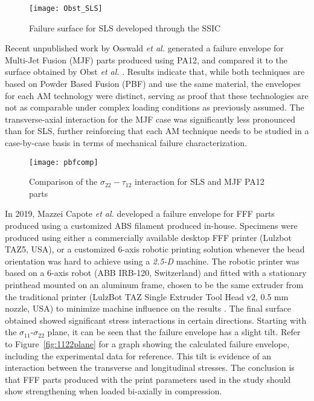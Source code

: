 \documentclass[main.tex]{subfiles}
\begin{document}
\begin{figure}[h]
	\center
	\texttt{[image: Obst\_SLS]}
	\caption{Failure surface for SLS developed through the SSIC \cite{Obst2018}} \label{fig:OOCSLS}
\end{figure}

Recent unpublished work by Osswald \emph{et al.} \cite{Osswald2020} generated a failure envelope for Multi-Jet Fusion (MJF) parts produced using PA12, and compared it to the surface obtained by Obst \emph{et al.} \cite{Obst2018}. Results indicate that, while both techniques are based on Powder Based Fusion (PBF) and use the same material, the envelopes for each AM technology were distinct, serving as proof that these technologies are not as comparable under complex loading conditions as previously assumed. The transverse-axial interaction for the MJF case was significantly less pronounced than for SLS, further reinforcing that each AM technique needs to be studied in a case-by-case basis in terms of mechanical failure characterization. 

\begin{figure}[!htbp]
	\center
	\texttt{[image: pbfcomp]}
	\caption{Comparison of the $\sigma_{22} - \tau_{12}$ interaction for SLS and MJF PA12 parts \cite{Osswald2020}} \label{fig:pbfcomp}
\end{figure}

In 2019, Mazzei Capote \emph{et al.} \cite{MazzeiCapote2019} developed a failure envelope for FFF parts produced using a customized ABS filament produced in-house. Specimens were produced using either a commercially available desktop FFF printer (Lulzbot TAZ5, USA), or a customized 6-axis robotic printing solution whenever the bead orientation was hard to achieve using a \emph{2.5-D} machine. The robotic printer was based on a 6-axis robot (ABB IRB-120, Switzerland) and fitted with a stationary printhead mounted on an aluminum frame, chosen to be the same extruder from the traditional printer (LulzBot TAZ Single Extruder Tool Head v2, 0.5 mm nozzle, USA) to minimize machine influence on the results \cite{VanHulle2017}. The final surface obtained showed significant stress interactions in certain directions. Starting with the $\sigma_{11}$-$\sigma_{22}$ plane, it can be seen that the failure envelope has a slight tilt. Refer to Figure~\ref{fig:1122plane} for a graph showing the calculated failure envelope, including the experimental data for reference. This tilt is evidence of an interaction between the transverse and longitudinal stresses. The conclusion is that FFF parts produced with the print parameters used in the study should show strengthening when loaded bi-axially in compression.
\end{document}
